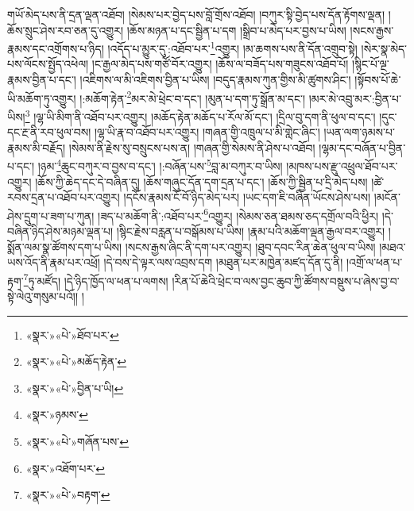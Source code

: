 གཡོ་མེད་པས་ནི་དྲན་ལྡན་འཐོབ། །སེམས་པར་བྱེད་པས་བློ་གྲོས་འཐོབ། །བཀུར་སྟི་བྱེད་པས་དོན་རྟོགས་ལྡན། །ཆོས་སྲུང་ཤེས་རབ་ཅན་དུ་འགྱུར། །ཆོས་མཉན་པ་དང་སྦྱིན་པ་དག །སྒྲིབ་པ་མེད་པར་བྱས་པ་ཡིས། །སངས་རྒྱས་རྣམས་དང་འགྲོགས་པ་ཉིད། །འདོད་པ་མྱུར་དུ་:འཐོབ་པར་\footnote{«སྣར་»«པེ་»ཐོབ་པར་}འགྱུར། །མ་ཆགས་པས་ནི་དོན་འགྲུབ་སྟེ། །སེར་སྣ་མེད་པས་ལོངས་སྤྱོད་འཕེལ། །ང་རྒྱལ་མེད་པས་གཙོ་བོར་འགྱུར། །ཆོས་ལ་བཟོད་པས་གཟུངས་འཐོབ་པོ། །སྙིང་པོ་ལྔ་རྣམས་བྱིན་པ་དང་། །འཇིགས་ལ་མི་འཇིགས་བྱིན་པ་ཡིས། །བདུད་རྣམས་ཀུན་གྱིས་མི་ཚུགས་ཤིང་། །སྟོབས་པོ་ཆེ་ཡི་མཆོག་ཏུ་འགྱུར། །:མཆོག་རྟེན་\footnote{«སྣར་»«པེ་»མཆོད་རྟེན་}མར་མེ་ཕྲེང་བ་དང་། །མུན་པ་དག་ཏུ་སྒྲོན་མ་དང་། །མར་མེ་འབྲུ་མར་:བྱིན་པ་ཡིས།\footnote{«སྣར་»«པེ་»བྱིན་པ་ཡི།} །ལྷ་ཡི་མིག་ནི་འཐོབ་པར་འགྱུར། །མཆོད་རྟེན་མཆོད་པ་རོལ་མོ་དང་། །དྲིལ་བུ་དག་ནི་ཕུལ་བ་དང་། །དུང་དང་རྔ་ནི་རབ་ཕུལ་བས། །ལྷ་ཡི་རྣ་བ་འཐོབ་པར་འགྱུར། །གཞན་གྱི་འཁྲུལ་པ་མི་གླེང་ཞིང་། །ཡན་ལག་ཉམས་པ་རྣམས་མི་བརྗོད། །སེམས་ནི་རྗེས་སུ་བསྲུངས་པས་ན། །གཞན་གྱི་སེམས་ནི་ཤེས་པ་འཐོབ། །ལྷམ་དང་བཞོན་པ་བྱིན་པ་དང་། །ཉམ་\footnote{«སྣར་»ཉམས་}ཆུང་བཀུར་བ་བྱས་བ་དང་། །:བཞོན་པས་\footnote{«སྣར་»«པེ་»གཞོན་པས་}བླ་མ་བཀུར་བ་ཡིས། །མཁས་པས་རྫུ་འཕྲུལ་ཐོབ་པར་འགྱུར། །ཆོས་ཀྱི་ཆེད་དང་དེ་བཞིན་དུ། །ཆོས་གཞུང་དོན་དག་དྲན་པ་དང་། །ཆོས་ཀྱི་སྦྱིན་པ་དྲི་མེད་པས། །ཚེ་རབས་དྲན་པ་འཐོབ་པར་འགྱུར། །དངོས་རྣམས་ངོ་བོ་ཉིད་མེད་པར། །ཡང་དག་ཇི་བཞིན་ཡོངས་ཤེས་པས། །མངོན་ཤེས་དྲུག་པ་ཟག་པ་ཀུན། །ཟད་པ་མཆོག་ནི་:འཐོབ་པར་\footnote{«སྣར་»འཐོག་པར་}འགྱུར། །སེམས་ཅན་ཐམས་ཅད་དགྲོལ་བའི་ཕྱིར། །དེ་བཞིན་ཉིད་ཤེས་མཉམ་ལྡན་པ། །སྙིང་རྗེས་བརླན་པ་བསྒོམས་པ་ཡིས། །རྣམ་པའི་མཆོག་ལྡན་རྒྱལ་བར་འགྱུར། །སྨོན་ལམ་སྣ་ཚོགས་དག་པ་ཡིས། །སངས་རྒྱས་ཞིང་ནི་དག་པར་འགྱུར། །ཐུབ་དབང་རིན་ཆེན་ཕུལ་བ་ཡིས། །མཐའ་ཡས་འོད་ནི་རྣམ་པར་འཕྲོ། །དེ་བས་དེ་ལྟར་ལས་འབྲས་དག །མཐུན་པར་མཁྱེན་མཛད་དོན་དུ་ནི། །འགྲོ་ལ་ཕན་པ་རྟག་\footnote{«སྣར་»«པེ་»བརྟག་}ཏུ་མཛོད། །དེ་ཉིད་ཁྱོད་ལ་ཕན་པ་ལགས། །རིན་པོ་ཆེའི་ཕྲེང་བ་ལས་བྱང་ཆུབ་ཀྱི་ཚོགས་བསྡུས་པ་ཞེས་བྱ་བ་སྟེ་ལེའུ་གསུམ་པའོ།། །
